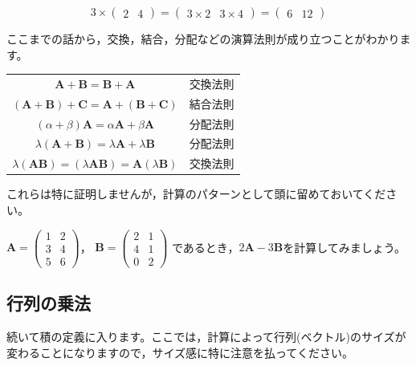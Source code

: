 \documentclass{ltjsbook}
\begin{document}
\begin{equation*}
	3 \times
	\begin{pmatrix}
		2 & 4
	\end{pmatrix}
	=
	\begin{pmatrix}
		3 \times 2 & 3 \times 4
	\end{pmatrix}
	=
	\begin{pmatrix}
		6 & 12
	\end{pmatrix}
\end{equation*}

ここまでの話から，交換，結合，分配などの演算法則が成り立つことがわかります。

\begin{center}
	\begin{tabular}{cr}
		$\bm{A} + \bm{B}  = \bm{B} + \bm{A}$                               & 交換法則 \\
		$(\bm{A} + \bm{B})+\bm{C}  = \bm{A} + (\bm{B}+\bm{C})$             & 結合法則 \\
		$(\alpha + \beta)\bm{A} = \alpha\bm{A} + \beta\bm{A}$              & 分配法則 \\
		$\lambda(\bm{A}+\bm{B}) = \lambda\bm{A} + \lambda\bm{B}$           & 分配法則 \\
		$\lambda(\bm{AB}) = (\lambda\bm{A}\bm{B}) = \bm{A}(\lambda\bm{B})$ & 交換法則 \\
	\end{tabular}
\end{center}

これらは特に証明しませんが，計算のパターンとして頭に留めておいてください。

\begin{reidai}{}{}

	$\bm{A} = \begin{pmatrix} 1 & 2 \\ 3 & 4 \\ 5 & 6\end{pmatrix}$，
	$\bm{B} = \begin{pmatrix} 2 & 1 \\ 4 & 1 \\ 0 & 2\end{pmatrix}$
	であるとき，$2\bm{A} -3 \bm{B}$を計算してみましょう。

\end{reidai}

\subsection{行列の乗法}
続いて積の定義に入ります。ここでは，計算によって行列(ベクトル)のサイズが変わることになりますので，サイズ感に特に注意を払ってください。
\end{document}
